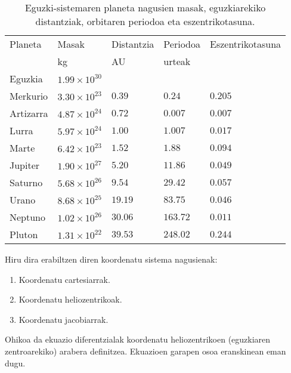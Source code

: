 \begin{table} [h!]
\caption{Eguzki-sistemaren planeta nagusien masak, eguzkiarekiko distantziak, orbitaren periodoa eta eszentrikotasuna.}
\label{tab:eguz-sist}       %
\begin{tabular}{l l l l l} 
\hline
 Planeta   &  Masak                 & Distantzia   & Periodoa    & Eszentrikotasuna\\   
           &  kg                    & AU           &   urteak    &               \\ \hline
 Eguzkia   &  $1.99 \times 10^{30}$ &              &             &               \\         
 Merkurio  &  $3.30 \times 10^{23}$ & $0.39$       &  $0.24$     &  $0.205$      \\
 Artizarra &  $4.87 \times 10^{24}$ & $0.72$       &  $0.007$    &  $0.007$      \\
 Lurra     &  $5.97 \times 10^{24}$ & $1.00$       &  $1.007$    &  $0.017$      \\
 Marte     &  $6.42 \times 10^{23}$ & $1.52$       &  $1.88$     &  $0.094$      \\ \hline
 Jupiter   &  $1.90 \times 10^{27}$ & $5.20$       &  $11.86$    &  $0.049$      \\
 Saturno   &  $5.68 \times 10^{26}$ & $9.54$       &  $29.42$    &  $0.057$      \\
 Urano     &  $8.68 \times 10^{25}$ & $19.19$      &  $83.75$    &  $0.046$      \\
 Neptuno   &  $1.02 \times 10^{26}$ & $30.06$      &  $163.72$   &  $0.011$      \\
 Pluton    &  $1.31 \times 10^{22}$ & $39.53$      &  $248.02$   &  $0.244$      \\
\hline
\end{tabular}
\end{table}

Hiru dira erabiltzen diren koordenatu sistema nagusienak:

\begin{enumerate}
\item Koordenatu cartesiarrak.
\item Koordenatu heliozentrikoak.
\item Koordenatu jacobiarrak.
\end{enumerate}

Ohikoa da ekuazio diferentzialak koordenatu heliozentrikoen (eguzkiaren zentroarekiko) arabera definitzea. 
Ekuazioen garapen osoa eranskinean eman dugu.



